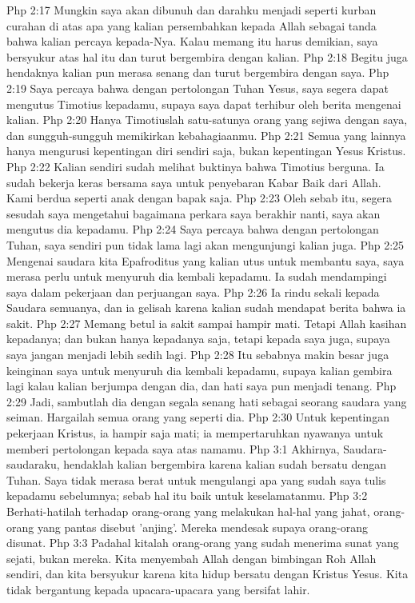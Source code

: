 Php 2:17  Mungkin saya akan dibunuh dan darahku menjadi seperti kurban curahan di atas apa yang kalian persembahkan kepada Allah sebagai tanda bahwa kalian percaya kepada-Nya. Kalau memang itu harus demikian, saya bersyukur atas hal itu dan turut bergembira dengan kalian.
Php 2:18  Begitu juga hendaknya kalian pun merasa senang dan turut bergembira dengan saya.
Php 2:19  Saya percaya bahwa dengan pertolongan Tuhan Yesus, saya segera dapat mengutus Timotius kepadamu, supaya saya dapat terhibur oleh berita mengenai kalian.
Php 2:20  Hanya Timotiuslah satu-satunya orang yang sejiwa dengan saya, dan sungguh-sungguh memikirkan kebahagiaanmu.
Php 2:21  Semua yang lainnya hanya mengurusi kepentingan diri sendiri saja, bukan kepentingan Yesus Kristus.
Php 2:22  Kalian sendiri sudah melihat buktinya bahwa Timotius berguna. Ia sudah bekerja keras bersama saya untuk penyebaran Kabar Baik dari Allah. Kami berdua seperti anak dengan bapak saja.
Php 2:23  Oleh sebab itu, segera sesudah saya mengetahui bagaimana perkara saya berakhir nanti, saya akan mengutus dia kepadamu.
Php 2:24  Saya percaya bahwa dengan pertolongan Tuhan, saya sendiri pun tidak lama lagi akan mengunjungi kalian juga.
Php 2:25  Mengenai saudara kita Epafroditus yang kalian utus untuk membantu saya, saya merasa perlu untuk menyuruh dia kembali kepadamu. Ia sudah mendampingi saya dalam pekerjaan dan perjuangan saya.
Php 2:26  Ia rindu sekali kepada Saudara semuanya, dan ia gelisah karena kalian sudah mendapat berita bahwa ia sakit.
Php 2:27  Memang betul ia sakit sampai hampir mati. Tetapi Allah kasihan kepadanya; dan bukan hanya kepadanya saja, tetapi kepada saya juga, supaya saya jangan menjadi lebih sedih lagi.
Php 2:28  Itu sebabnya makin besar juga keinginan saya untuk menyuruh dia kembali kepadamu, supaya kalian gembira lagi kalau kalian berjumpa dengan dia, dan hati saya pun menjadi tenang.
Php 2:29  Jadi, sambutlah dia dengan segala senang hati sebagai seorang saudara yang seiman. Hargailah semua orang yang seperti dia.
Php 2:30  Untuk kepentingan pekerjaan Kristus, ia hampir saja mati; ia mempertaruhkan nyawanya untuk memberi pertolongan kepada saya atas namamu.
Php 3:1  Akhirnya, Saudara-saudaraku, hendaklah kalian bergembira karena kalian sudah bersatu dengan Tuhan. Saya tidak merasa berat untuk mengulangi apa yang sudah saya tulis kepadamu sebelumnya; sebab hal itu baik untuk keselamatanmu.
Php 3:2  Berhati-hatilah terhadap orang-orang yang melakukan hal-hal yang jahat, orang-orang yang pantas disebut 'anjing'. Mereka mendesak supaya orang-orang disunat.
Php 3:3  Padahal kitalah orang-orang yang sudah menerima sunat yang sejati, bukan mereka. Kita menyembah Allah dengan bimbingan Roh Allah sendiri, dan kita bersyukur karena kita hidup bersatu dengan Kristus Yesus. Kita tidak bergantung kepada upacara-upacara yang bersifat lahir.
